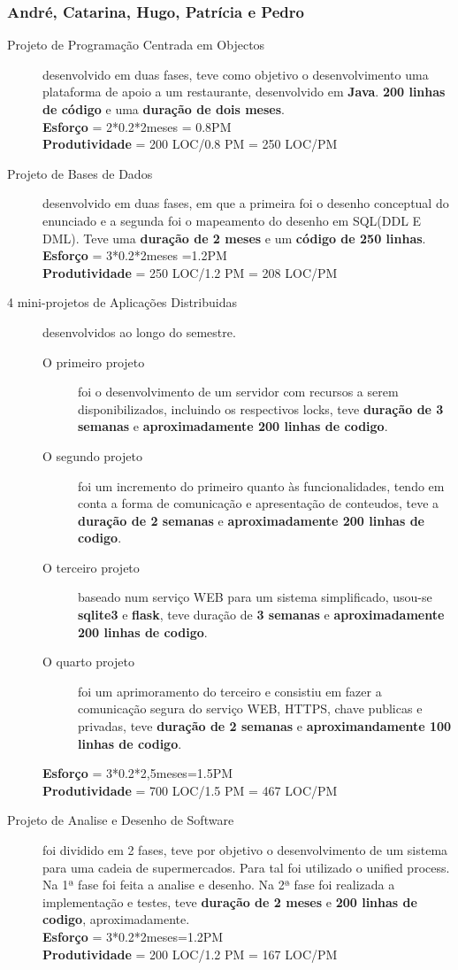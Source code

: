 \documentclass[a4paper]{report}
\begin{document}
\subsubsection*{André, Catarina, Hugo, Patrícia e Pedro} 
\begin{description}
    \item[Projeto de Programação Centrada em Objectos] desenvolvido em duas fases, teve como objetivo o desenvolvimento uma plataforma de apoio a um restaurante, desenvolvido em \textbf{Java}. \textbf{200 linhas de código} e uma \textbf{duração de dois meses}.\\\textbf{Esforço} = 2*0.2*2meses = 0.8PM\\ \textbf{Produtividade} = 200 LOC/0.8 PM = 250 LOC/PM
    
    \item[Projeto de Bases de Dados] desenvolvido em duas fases, em que a primeira foi o desenho conceptual do enunciado e a segunda foi o mapeamento do desenho em SQL(DDL E DML). Teve uma \textbf{duração de 2 meses} e um \textbf{código de 250 linhas}.\\\textbf{Esforço} = 3*0.2*2meses =1.2PM\\ \textbf{Produtividade} = 250 LOC/1.2 PM = 208 LOC/PM
    \item[4 mini-projetos de Aplicações Distribuidas] desenvolvidos ao longo do semestre.
    \begin{description}
    	\item[O primeiro projeto] foi o desenvolvimento de um servidor com recursos a serem disponibilizados, incluindo os respectivos locks, teve  \textbf{duração de 3 semanas} e \textbf{aproximadamente 200 linhas de codigo}.
    	\item[O segundo projeto] foi um incremento do primeiro quanto às funcionalidades, tendo em conta a forma de comunicação e apresentação de conteudos, teve a \textbf{duração de 2 semanas} e \textbf{aproximadamente 200 linhas de codigo}.
    	\item[O terceiro projeto] baseado num serviço WEB para um sistema simplificado, usou-se \textbf{sqlite3} e \textbf{flask}, teve duração de \textbf{3 semanas} e \textbf{aproximadamente 200 linhas de codigo}.
    	\item[O quarto projeto] foi um aprimoramento do terceiro e consistiu em fazer a comunicação segura do serviço WEB, HTTPS, chave publicas e privadas, teve \textbf{duração de 2 semanas} e \textbf{aproximandamente 100 linhas de codigo}.
    \end{description}\mbox{}\textbf{Esforço} = 3*0.2*2,5meses=1.5PM\\ \textbf{Produtividade} = 700 LOC/1.5 PM = 467 LOC/PM
    \item[Projeto de Analise e Desenho de Software] foi dividido em 2 fases, teve por objetivo o desenvolvimento de um sistema para uma cadeia de supermercados. Para tal foi utilizado o unified process. Na 1ª fase foi feita a analise e desenho. Na 2ª fase foi realizada a  implementação e testes, teve \textbf{duração de 2 meses} e \textbf{200 linhas de codigo}, aproximadamente.\\\textbf{Esforço} = 3*0.2*2meses=1.2PM\\ \textbf{Produtividade} = 200 LOC/1.2 PM = 167 LOC/PM
    

\end{description}
\end{document}
